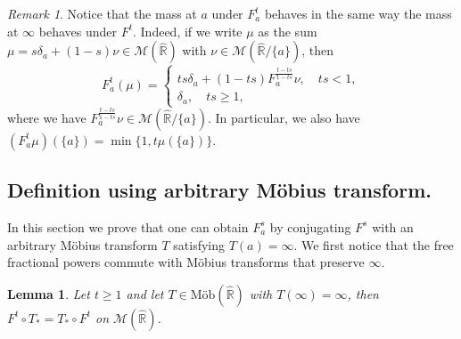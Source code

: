 \documentclass[reqno,11pt]{amsart}
\newtheorem{lemma}[theorem]{Lemma}
\theoremstyle{remark}
\newtheorem{remark}[theorem]{Remark}
\newcommand{\rr}{\mathbb{R}}
\newcommand{\MM}{\mathcal{M}}
\newcommand{\freepower}[1]{F^{#1}}
\newcommand{\pfreepower}[2]{F_{#1}^{#2}}
\newcommand{\mobr}{\text{Möb}(\hat{\rr})}
\begin{document}
\begin{remark}\label{rmk:defnofpfreepower}
Notice that the mass at $a$ under $\pfreepower{a}{t}$ behaves in the same way the mass at $\infty$ behaves under $\freepower{t}$. Indeed, if we write $\mu$ as the sum $ \mu = s\delta_{a}+(1-s)\nu\in \MM(\hat{\rr}) $ with $ \nu \in \MM(\hat{\rr}/\{a\}) $, then
    \begin{equation}
\label{eq:pfreepower.gen.}
    \pfreepower{a}{t}(\mu) = \begin{cases}
        ts\delta_a + (1-ts)\pfreepower{a}{\frac{t-ts}{1-ts}}\nu,\quad ts<1,\\
        \delta_a, \quad ts\geq 1,
    \end{cases}
\end{equation}
where we have $ \pfreepower{a}{\frac{t-ts}{1-ts}}\nu \in \MM(\hat{\rr}/\{a\})$. In particular, we also have $ (\pfreepower{a}{t} \mu)(\{a\}) = \min\{1,t\mu(\{a\})\} $.
\end{remark}


\subsection{Definition using arbitrary Möbius transform.}
In this section we prove that one can obtain $\pfreepower{a}{s}$ by conjugating $\freepower{s}$ with an arbitrary Möbius transform $T$ satisfying $T(a)=\infty$. We first notice that the free fractional powers commute with Möbius transforms that preserve $\infty$.

\begin{lemma}
\label{lem:freepower.commutes.mob.infty}
Let $t\geq 1$ and let $T\in\mobr$ with $T(\infty)=\infty$, then $\freepower{t}\circ T_* = T_*\circ\freepower{t}$ on $\MM(\hat{\rr})$.
\end{lemma}
\end{document}
